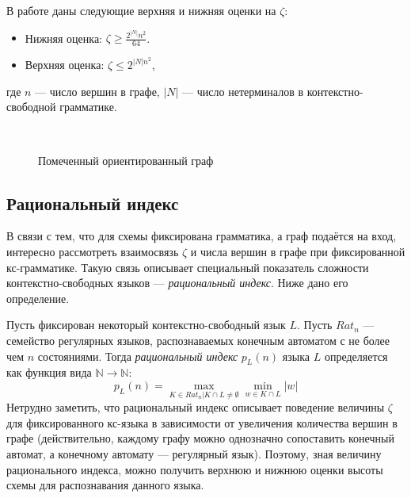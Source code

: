 \documentclass{spbau-diploma}
\begin{document}
В работе \cite{HellingsCFPQ} даны следующие верхняя и нижняя оценки на $\zeta$:
\begin{itemize}
\item Нижняя оценка:  $\zeta \ge \frac{2^{|N|}n^2}{64} $.
\item Верхняя оценка: $\zeta \le 2^{|N|n^2}$,
\end{itemize}
где $n$ --- число вершин в графе, $|N|$ --- число нетерминалов в контекстно-свободной грамматике. 
\begin{figure}
\centering

\\
	\caption{Помеченный ориентированный граф}
\label{graph}
\end{figure}
\subsection{Рациональный индекс}
В связи с тем, что для схемы фиксирована грамматика, а граф подаётся на вход, интересно рассмотреть взаимосвязь $\zeta$ и числа вершин в графе при фиксированной кс-грамматике. 
Такую связь описывает специальный показатель сложности контекстно-свободных языков --- \textit{рациональный индекс}. Ниже дано его определение.

Пусть фиксирован некоторый контекстно-свободный язык $L$. Пусть $Rat_n$ --- семейство регулярных языков, распознаваемых конечным автоматом с  не более чем $n$ состояниями.  Тогда \textit{рациональный индекс} $p_L(n)$ языка $L$ определяется как функция вида $\mathbb{N} \rightarrow \mathbb{N}$:
\begin{equation}
p_L(n) = \max\limits_{K \in Rat_n | K  \cap L \neq \emptyset} \min\limits_{w \in K  \cap L } |w|
\end{equation}
Нетрудно заметить, что рациональный индекс описывает поведение величины  $\zeta$ для фиксированного кс-языка в зависимости от увеличения количества вершин в графе (действительно, каждому графу можно однозначно сопоставить конечный автомат, а конечному автомату --- регулярный язык).  Поэтому, зная величину рационального индекса, можно получить верхнюю и нижнюю оценки высоты схемы для распознавания данного языка.
\end{document}

